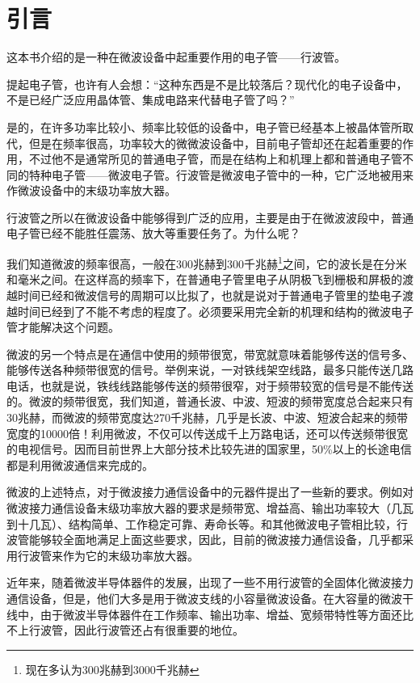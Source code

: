 \chapter{引言}

这本书介绍的是一种在微波设备中起重要作用的电子管——行波管。

提起电子管，也许有人会想：“这种东西是不是比较落后？现代化的电子设备中，不是已经广泛应用晶体管、集成电路来代替电子管了吗？”

是的，在许多功率比较小、频率比较低的设备中，电子管已经基本上被晶体管所取代，但是在频率很高，功率较大的微微波设备中，目前电子管却还在起着重要的作用，不过他不是通常所见的普通电子管，而是在结构上和机理上都和普通电子管不同的特种电子管——微波电子管。行波管是微波电子管中的一种，它广泛地被用来作微波设备中的末级功率放大器。

行波管之所以在微波设备中能够得到广泛的应用，主要是由于在微波波段中，普通电子管已经不能胜任震荡、放大等重要任务了。为什么呢？

我们知道微波的频率很高，一般在300兆赫到300千兆赫\footnote{现在多认为300兆赫到3000千兆赫}之间，它的波长是在分米和毫米之间。在这样高的频率下，在普通电子管里电子从阴极飞到栅极和屏极的渡越时间已经和微波信号的周期可以比拟了，也就是说对于普通电子管里的垫电子渡越时间已经到了不能不考虑的程度了。必须要采用完全新的机理和结构的微波电子管才能解决这个问题。

微波的另一个特点是在通信中使用的频带很宽，带宽就意味着能够传送的信号多、能够传送各种频带很宽的信号。举例来说，一对铁线架空线路，最多只能传送几路电话，也就是说，铁线线路能够传送的频带很窄，对于频带较宽的信号是不能传送的。微波的频带很宽，我们知道，普通长波、中波、短波的频带宽度总合起来只有30兆赫，而微波的频带宽度达270千兆赫，几乎是长波、中波、短波合起来的频带宽度的10000倍！利用微波，不仅可以传送成千上万路电话，还可以传送频带很宽的电视信号。因而目前世界上大部分技术比较先进的国家里，50\%以上的长途电信都是利用微波通信来完成的。

微波的上述特点，对于微波接力通信设备中的元器件提出了一些新的要求。例如对微波接力通信设备末级功率放大器的要求是频带宽、增益高、输出功率较大（几瓦到十几瓦）、结构简单、工作稳定可靠、寿命长等。和其他微波电子管相比较，行波管能够较全面地满足上面这些要求，因此，目前的微波接力通信设备，几乎都采用行波管来作为它的末级功率放大器。

近年来，随着微波半导体器件的发展，出现了一些不用行波管的全固体化微波接力通信设备，但是，他们大多是用于微波支线的小容量微波设备。在大容量的微波干线中，由于微波半导体器件在工作频率、输出功率、增益、宽频带特性等方面还比不上行波管，因此行波管还占有很重要的地位。

